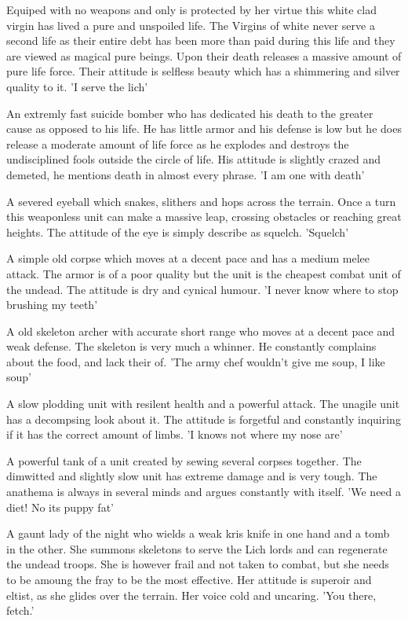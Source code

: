 \documentclass[a4paper]{article}
\begin{document}
Equiped with no weapons and only is protected by her virtue this white clad virgin has lived a pure and unspoiled life. The Virgins of white never serve a second life as their entire debt has been more than paid during this life and they are viewed as magical pure beings. Upon their death releases a massive amount of pure life force. Their attitude is selfless beauty which has a shimmering and silver quality to it. 'I serve the lich'

An extremly fast suicide bomber who has dedicated his death to the greater cause as opposed to his life. He has little armor and his defense is low but he does release a moderate amount of life force as he explodes and destroys the undisciplined fools outside the circle of life. His attitude is slightly crazed and demeted, he mentions death in almost every phrase. 'I am one with death'

A severed eyeball which snakes, slithers and hops across the terrain. Once a turn this weaponless unit can make a massive leap, crossing obstacles or reaching great heights. The attitude of the eye is simply describe as squelch. 'Squelch'

A simple old corpse which moves at a decent pace and has a medium melee attack. The armor is of a poor quality but the unit is the cheapest combat unit of the undead. The attitude is dry and cynical humour. 'I never know where to stop brushing my teeth'

A old skeleton archer with accurate short range who moves at a decent pace and weak defense. The skeleton is very much a whinner. He constantly complains about the food, and lack their of. 'The army chef wouldn't give me soup, I like soup'

A slow plodding unit with resilent health and a powerful attack. The unagile unit has a decompsing look about it. The attitude is forgetful and constantly inquiring if it has the correct amount of limbs. 'I knows not where my nose are'

A powerful tank of a unit created by sewing several corpses together. The dimwitted and slightly slow unit has extreme damage and is very tough. The anathema is always in several minds and argues constantly with itself. 'We need a diet! No its puppy fat'

A gaunt lady of the night who wields a weak kris knife in one hand and a tomb in the other. She summons skeletons to serve the Lich lords and can regenerate the undead troops. She is however frail and not taken to combat, but she needs to be amoung the fray to be the most effective. Her attitude is superoir and eltist, as she glides over the terrain. Her voice cold and uncaring. 'You there, fetch.'
\end{document}
